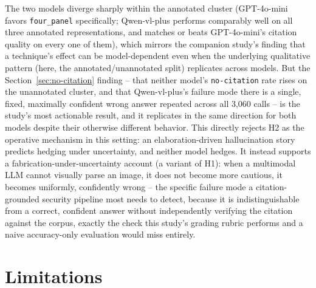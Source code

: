 \documentclass[twocolumn]{svjour3}
\begin{document}
The two models diverge sharply within the annotated cluster (GPT-4o-mini favors \texttt{four\_panel}
specifically; Qwen-vl-plus performs comparably well on all three annotated representations, and
matches or beats GPT-4o-mini's citation quality on every one of them), which mirrors the companion
study's finding that a technique's effect can be model-dependent even when the underlying
qualitative pattern (here, the annotated/unannotated split) replicates across models. But the
Section~\ref{sec:no-citation} finding -- that neither model's \texttt{no-citation} rate rises on the
unannotated cluster, and that Qwen-vl-plus's failure mode there is a single, fixed, maximally
confident wrong answer repeated across all 3,060 calls -- is the study's most actionable result, and
it replicates in the same direction for both models despite their otherwise different behavior. This
directly rejects H2 as the operative mechanism in this setting: an elaboration-driven hallucination
story predicts hedging under uncertainty, and neither model hedges. It instead supports a
fabrication-under-uncertainty account (a variant of H1): when a multimodal LLM cannot visually parse
an image, it does not become more cautious, it becomes uniformly, confidently wrong -- the specific
failure mode a citation-grounded security pipeline most needs to detect, because it is
indistinguishable from a correct, confident answer without independently verifying the citation
against the corpus, exactly the check this study's grading rubric performs and a naive
accuracy-only evaluation would miss entirely.

\section{Limitations}
\label{sec:limitations}
\end{document}
